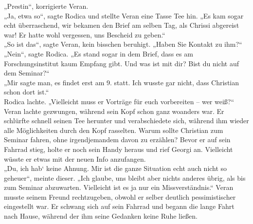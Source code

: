 \documentclass[oneside]{memoir}
\begin{document}
„Prestin“, korrigierte Veran. \\
„Ja, etwa so“, sagte Rodica und stellte Veran eine Tasse Tee hin. „Es kam sogar echt überraschend, wir bekamen den Brief am selben Tag, als Chrissi abgereist war! Er hatte wohl vergessen, uns Bescheid zu geben.“ \\
„So ist das“, sagte Veran, kein bisschen beruhigt. „Haben Sie Kontakt zu ihm?“ \\
„Nein“, sagte Rodica. „Es stand sogar in dem Brief, dass es am Forschungsinstitut kaum Empfang gibt. Und was ist mit dir? Bist du nicht auf dem Seminar?“ \\
„Mir sagte man, es findet erst am 9. statt. Ich wusste gar nicht, dass Christian schon dort ist.“ \\
Rodica lachte.
„Vielleicht muss er Vorträge für euch vorbereiten – wer weiß?“ \\
Veran lachte gezwungen, während sein Kopf schon ganz woanders war. Er schlürfte schnell seinen Tee herunter und verabschiedete sich, während ihm wieder alle Möglichkeiten durch den Kopf rasselten. Warum sollte Christian zum Seminar fahren, ohne irgendjemandem davon zu erzählen? Bevor er auf sein Fahrrad stieg, holte er noch sein Handy heraus und rief Georgi an. Vielleicht wüsste er etwas mit der neuen Info anzufangen. \\
„Du, ich hab‘ keine Ahnung. Mir ist die ganze Situation echt auch nicht so geheuer“, meinte dieser. „Ich glaube, uns bleibt aber nichts anderes übrig, als bis zum Seminar abzuwarten. Vielleicht ist es ja nur ein Missverständnis.“ Veran musste seinem Freund rechtzugeben, obwohl er selber deutlich pessimistischer eingestellt war. Er schwang sich auf sein Fahrrad und begann die lange Fahrt nach Hause, während der ihm seine Gedanken keine Ruhe ließen.
\newpage
\thispagestyle{plain}
\end{document}
